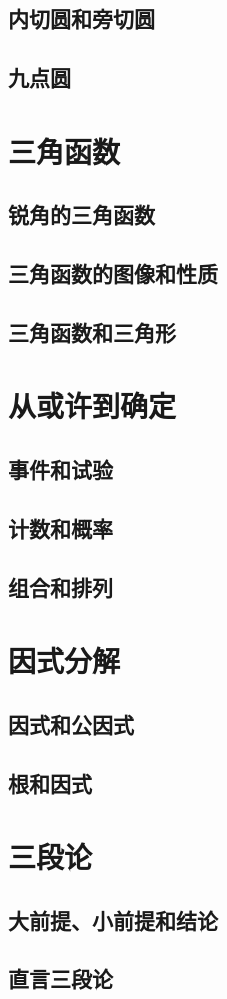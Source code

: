 \documentclass[12pt,UTF8]{ctexbook}
\begin{document}
\section{内切圆和旁切圆}
\section{九点圆}

\chapter{三角函数}
\section{锐角的三角函数}
\section{三角函数的图像和性质}
\section{三角函数和三角形}


\chapter{从或许到确定}
\section{事件和试验}
\section{计数和概率}
\section{组合和排列}

\chapter{因式分解}
\section{因式和公因式}
\section{根和因式}

\chapter{三段论}
\section{大前提、小前提和结论}
\section{直言三段论}
\end{document}

